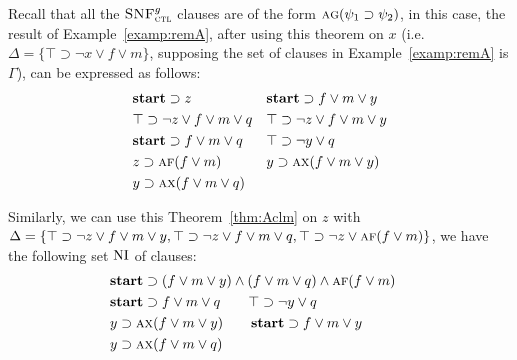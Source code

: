 \documentclass[letterpaper]{article} %
\begin{document}



Recall that all the ${\textsc{SNF}_{\textsc{ctl}}^g}$ clauses are of the form $\textsc{a}\textsc{g}(\psi_1 \supset \psi_2)$, in this case, the result of Example~\ref{examp:remA}, after using this theorem on $x$ (i.e. $\Delta = \{\top \supset \neg x \vee f \vee m\}$, supposing the set of clauses in Example~\ref{examp:remA} is $\Gamma$), can be expressed as follows:
\begin{align*}
& \textbf{start}\supset z &&  \textbf{start} \supset f \vee m \vee y \\
&  \top \supset \neg z \vee f \vee m \vee q &&  \top \supset \neg z \vee f \vee m \vee y \\
&  \textbf{start} \supset f\vee m \vee q &&  \top \supset \neg y \vee q\\
&  z \supset \textsc{a} \textsc{f} (f \vee m) &&   y \supset \textsc{a} \textsc{x}(f \vee m \vee y) \\
& y \supset \textsc{a}\textsc{x}(f \vee m\vee q) &&  \\
\end{align*}

Similarly, we can use this Theorem~\ref{thm:Aclm} on $z$ with $\Delta=\{\top \supset \neg z \vee f \vee m \vee y, \top \supset \neg z \vee f \vee m\vee q, \top \supset \neg z \vee \textsc{a} \textsc{f} (f \vee m)\}$, we have the following set $\textrm{NI}$ of clauses:
\begin{align*}
 & \textbf{start}\supset (f \vee m \vee y) \wedge (f \vee m\vee q) \wedge \textsc{a} \textsc{f} (f \vee m) && \\
 &  \textbf{start} \supset f\vee m \vee q \qquad \top \supset \neg y \vee q\\
 & y \supset \textsc{a} \textsc{x}(f \vee m \vee y) \qquad \textbf{start} \supset f \vee m \vee y \\
&  y \supset \textsc{a}\textsc{x}(f \vee m\vee q) \qquad   \\
\end{align*}
\end{document}
